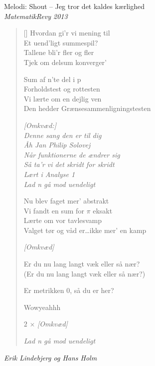 \newpage

{Melodi: Shout -- Jeg tror det kaldes kærlighed}\\[.2em]
{\small\itshape MatematikRevy 2013}

\begin{multicols}{2}
\settowidth{\versewidth}{Er du nu lang langt væk eller så nær?}
\begin{verse}[\versewidth]
Hvordan gi’r vi mening til\\
Et uend’ligt summespil?\\
Tallene bli’r fler og fler\\
Tjek om delsum konverger’

Sum af n’te del i p\\
Forholdstest og rottesten\\
Vi lærte om en dejlig ven\\
Den hedder Grænsesammenligningstesten

\emph{[Omkvæd:]\\
Denne sang den er til dig\\
Åh Jan Philip Solovej\\
Når funktionerne de ændrer sig\\
Så ta’r vi det skridt for skridt\\
Lært i Analyse 1\\
Lad n gå mod uendeligt}

\columnbreak
Nu blev faget mer’ abstrakt\\
Vi fandt en sum for $\pi$ eksakt\\
Lærte om vor tavlesvamp\\
Valget tør og våd er\ldots ikke mer’ en kamp

\emph{[Omkvæd]}

Er du nu lang langt væk eller så nær?\\
(Er du nu lang langt væk eller så nær?)

Er metrikken 0, så du er her?

Wowyeahhh

$2\,\times\,$\emph{[Omkvæd]}

\emph{Lad n gå mod uendeligt}
\end{verse}
\end{multicols}




{\small\itshape Erik Lindebjerg og Hans Holm}

